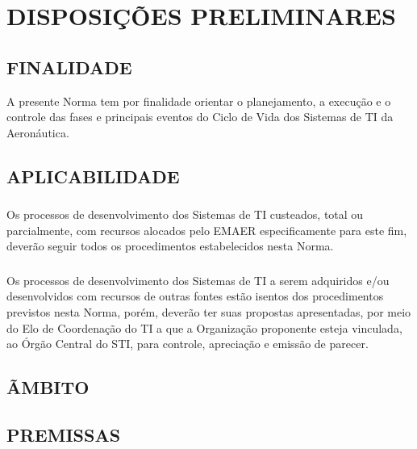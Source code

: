 \chapter{DISPOSIÇÕES PRELIMINARES}

    \section{FINALIDADE}
    
        A presente Norma tem por finalidade orientar o planejamento, a execução e o controle das fases e principais eventos do Ciclo de Vida dos Sistemas de TI da Aeronáutica.
    
    \section{APLICABILIDADE}
    
        \subsection{}
            
            Os processos de desenvolvimento dos Sistemas de TI custeados, total ou parcialmente, com recursos alocados pelo EMAER especificamente para este fim, deverão seguir todos os procedimentos estabelecidos nesta Norma.
            
        \subsection{}
        
            Os processos de desenvolvimento dos Sistemas de TI a serem adquiridos e/ou desenvolvidos com recursos de outras fontes estão isentos dos procedimentos previstos nesta Norma, porém, deverão ter suas propostas apresentadas, por meio do Elo de Coordenação do TI a que a Organização proponente esteja vinculada, ao Órgão Central do STI, para controle, apreciação e emissão de parecer.
    
    
    \section{ÃMBITO}
    
    
    
    \section{PREMISSAS}




